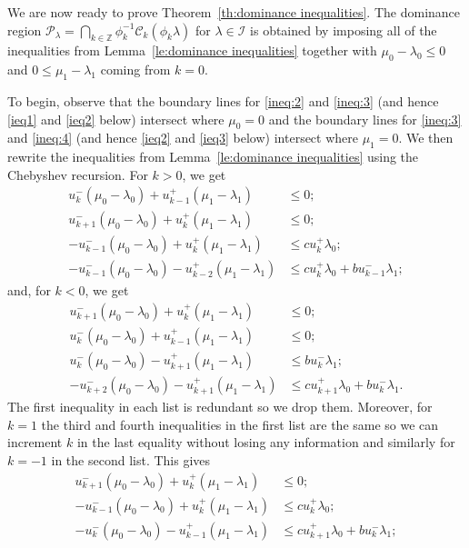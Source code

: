 \documentclass{amsart}
\numberwithin{theorem}{section}
\newcommand{\cC}{\mathcal{C}}
\newcommand{\cI}{\mathcal{I}}
\newcommand{\cP}{\mathcal{P}}
\newcommand{\ZZ}{\mathbb{Z}}
\begin{document}
  We are now ready to prove Theorem~\ref{th:dominance inequalities}.
  The dominance region $\cP_\lambda=\bigcap_{k\in\ZZ}\phi_k^{-1}\cC_k(\phi_k\lambda)$ for $\lambda\in\cI$ is obtained by imposing all of the inequalities from Lemma~\ref{le:dominance inequalities} together with $\mu_0 -\lambda_0 \le 0$ and $0 \le \mu_1 - \lambda_1$ coming from $k=0$.

  To begin, observe that the boundary lines for \eqref{ineq:2} and \eqref{ineq:3} (and hence \eqref{ieq1} and \eqref{ieq2} below) intersect where $\mu_0=0$ and the boundary lines for \eqref{ineq:3} and \eqref{ineq:4} (and hence \eqref{ieq2} and \eqref{ieq3} below) intersect where $\mu_1=0$.
  We then rewrite the inequalities from Lemma~\ref{le:dominance inequalities} using the Chebyshev recursion.
  For $k>0$, we get
  \begin{align*}
    u_k^-(\mu_0-\lambda_0)+u_{k-1}^+(\mu_1-\lambda_1) &\le 0;\\
    u_{k+1}^-(\mu_0-\lambda_0)+u_k^+(\mu_1-\lambda_1) &\le 0;\\
    -u_{k-1}^-(\mu_0-\lambda_0)+u_k^+(\mu_1-\lambda_1) &\le cu_k^+\lambda_0;\\
    -u_{k-1}^-(\mu_0-\lambda_0)-u_{k-2}^+(\mu_1-\lambda_1) &\le cu_k^+\lambda_0+bu_{k-1}^-\lambda_1;
  \end{align*}
  and, for $k<0$, we get
  \begin{align*}
    u_{k+1}^-(\mu_0-\lambda_0)+u_k^+(\mu_1-\lambda_1) &\le 0;\\
    u_k^-(\mu_0-\lambda_0)+u_{k-1}^+(\mu_1-\lambda_1) &\le 0;\\
    u_k^-(\mu_0-\lambda_0)-u_{k+1}^+(\mu_1-\lambda_1) &\le bu_k^-\lambda_1;\\
    -u_{k+2}^-(\mu_0-\lambda_0)-u_{k+1}^+(\mu_1-\lambda_1) &\le cu_{k+1}^+\lambda_0+bu_k^-\lambda_1.
  \end{align*}
  The first inequality in each list is redundant so we drop them.
  Moreover, for $k=1$ the third and fourth inequalities in the first list are the same so we can increment $k$ in the last equality without losing any information and similarly for $k=-1$ in the second list. 
  This gives
  \begin{align*}
    u_{k+1}^-(\mu_0-\lambda_0)+u_k^+(\mu_1-\lambda_1) &\le 0;\\
    -u_{k-1}^-(\mu_0-\lambda_0)+u_k^+(\mu_1-\lambda_1) &\le cu_k^+\lambda_0;\\
    -u_k^-(\mu_0-\lambda_0)-u_{k-1}^+(\mu_1-\lambda_1) &\le cu_{k+1}^+\lambda_0+bu_k^-\lambda_1;
  \end{align*}
\end{document}
